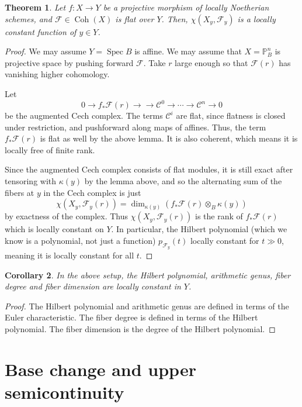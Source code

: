 \documentclass[10pt]{article}
\newtheorem{thm}{Theorem}[section]
\newtheorem{cor}[thm]{Corollary}
\theoremstyle{definition}
\DeclareMathOperator{\Coh}{Coh}
\DeclareMathOperator{\Spec}{Spec}
\newcommand{\PP}{\mathbb{P}}
\begin{document}
\begin{thm}
Let $f: X \rightarrow Y$ be a projective morphism of locally Noetherian schemes, and $\mathcal{F} \in \Coh(X)$ is flat over $Y$.  Then, $\chi(X_y, \mathcal{F}_y)$ is a locally constant function of $y \in Y$.
\end{thm}
\begin{proof}
We may assume $Y = \Spec B$ is affine.  We may assume that $X = \PP^n_B$ is projective space by pushing forward $\mathcal{F}$.  Take $r$ large enough so that $\mathcal{F}(r)$ has vanishing higher cohomology.

Let
$$0 \rightarrow f_* \mathcal{F}(r) \rightarrow \rightarrow \mathcal{C}^0 \rightarrow \cdots \rightarrow \mathcal{C}^n \rightarrow 0$$
be the augmented Cech complex.  The terms $\mathcal{C}^i$ are flat, since flatness is closed under restriction, and pushforward along maps of affines.  Thus, the term $f_* \mathcal{F}(r)$ is flat as well by the above lemma.  It is also coherent, which means it is locally free of finite rank.

Since the augmented Cech complex consists of flat modules, it is still exact after tensoring with $\kappa(y)$ by the lemma above, and so the alternating sum of the fibers at $y$ in the Cech complex is just
$$\chi(X_y, \mathcal{F}_y(r)) = \dim_{\kappa(y)}(f_*\mathcal{F}(r) \otimes_B \kappa(y))$$
by exactness of the complex.  Thus $\chi(X_y, \mathcal{F}_y(r))$ is the rank of $f_* \mathcal{F}(r)$ which is locally constant on $Y$.  In particular, the Hilbert polynomial (which we know is a polynomial, not just a function) $p_{\mathcal{F}_y}(t)$ locally constant for $t \gg 0$, meaning it is locally constant for all $t$.
\end{proof}

\begin{cor}
In the above setup, the Hilbert polynomial, arithmetic genus, fiber degree and fiber dimension are locally constant in $Y$.
\end{cor}
\begin{proof}
The Hilbert polynomial and arithmetic genus are defined in terms of the Euler characteristic.  The fiber degree is defined in terms of the Hilbert polynomial.  The fiber dimension is the degree of the Hilbert polynomial.
\end{proof}

\newpage


\section{Base change and upper semicontinuity}
\end{document}
